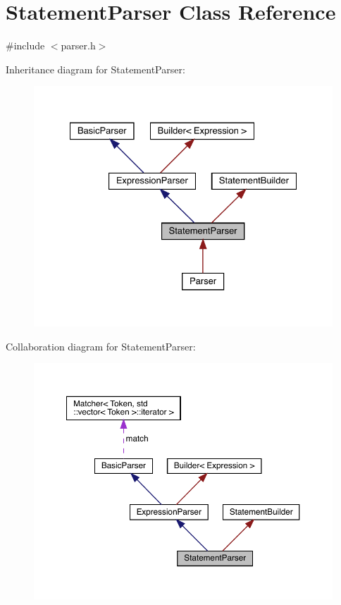 \hypertarget{class_statement_parser}{}\section{Statement\+Parser Class Reference}
\label{class_statement_parser}


{\ttfamily \#include $<$parser.\+h$>$}



Inheritance diagram for Statement\+Parser\+:\nopagebreak
\begin{figure}[H]
\begin{center}
\leavevmode
\includegraphics[width=328pt]{class_statement_parser__inherit__graph}
\end{center}
\end{figure}


Collaboration diagram for Statement\+Parser\+:\nopagebreak
\begin{figure}[H]
\begin{center}
\leavevmode
\includegraphics[width=350pt]{class_statement_parser__coll__graph}
\end{center}
\end{figure}
